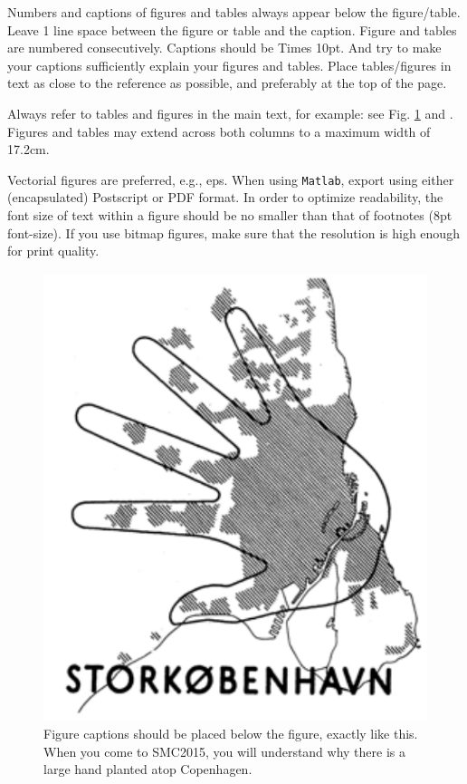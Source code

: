\documentclass{article}
\begin{document}
Numbers and captions of figures and tables always appear below the figure/table.
Leave 1 line space between the figure or table and the caption.
Figure and tables are numbered consecutively.
Captions should be Times 10pt.
And try to make your captions sufficiently explain your figures and tables.
Place tables/figures in text as close to the reference as possible,
and preferably at the top of the page.

Always refer to tables and figures in the main text, for example:
see Fig. \ref{fig:example} and .
Figures and tables may extend across both columns to a maximum width of 17.2cm.

Vectorial figures are preferred, e.g., eps.
When using \texttt{Matlab},
export using either (encapsulated) Postscript or PDF format.
In order to optimize readability,
the font size of text within a figure should be no smaller than
that of footnotes (8pt font-size).
If you use bitmap figures, make sure that
the resolution is high enough for print quality.

\begin{figure}[t]
\centering
\includegraphics[width=0.6\columnwidth]{figure}
\caption{Figure captions should be placed below the figure,
exactly like this.
When you come to SMC2015, you will
understand why there is a large hand
planted atop Copenhagen.\label{fig:example}}
\end{figure}

\end{document}
